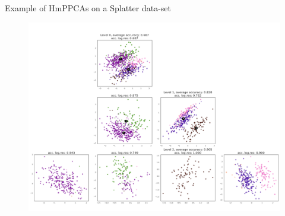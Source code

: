 \documentclass{beamer}
\begin{document}




\begin{frame}{Example of HmPPCAs on a Splatter data-set}
    \begin{figure}
        \centering
        \includegraphics[width=.8\linewidth]{complex_25_vb.png}
    \end{figure}
\end{frame}
\end{document}
